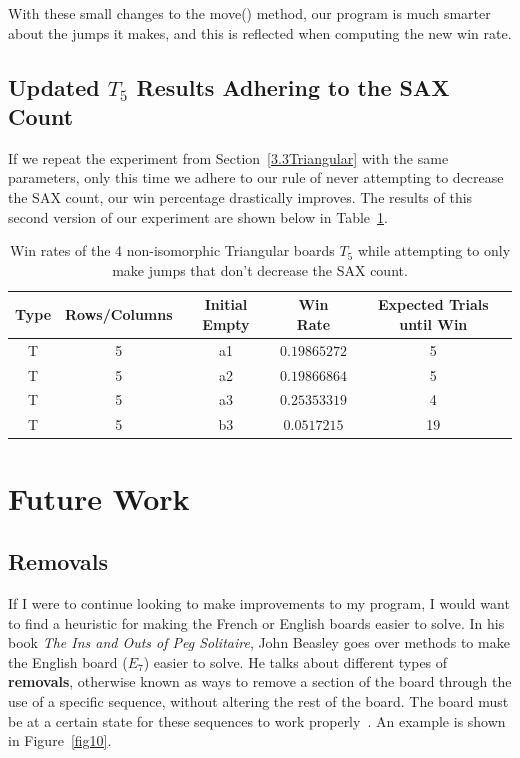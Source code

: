 \documentclass{article}
\begin{document}
With these small changes to the move() method, our program is much smarter about the jumps it makes, and this is reflected when computing the new win rate.

\subsection{Updated $T_5$ Results Adhering to the SAX Count}
\label{4.2UpatedResults}
If we repeat the experiment from Section~\ref{3.3Triangular} with the same parameters, only this time we adhere to our rule of never attempting to decrease the SAX count, our win percentage drastically improves. The results of this second version of our experiment are shown below in Table~\ref{tab4}.

\begin{table}[htb]
\begin{center} 
\begin{tabularx}{.88\textwidth}{ c  c  c  c  c }
\hline
\textbf{Type} & \textbf{Rows/Columns} &\textbf{Initial Empty} & \textbf{Win Rate} & \textbf{Expected Trials until Win}\\
\hline
T & 5 & a1 & $0.19865272$ & 5\\

T & 5 & a2 & $0.19866864$ & 5\\

T & 5 & a3 & $0.25353319$ & 4\\

T & 5 & b3 & $0.0517215$ & 19\\

\end{tabularx}
\caption{Win rates of the 4 non-isomorphic Triangular boards $T_5$ while attempting to only make jumps that don't decrease the SAX count.}
\label{tab4}
\end{center} 
\end{table}

\section{Future Work}
\label{5FutureWork}
\subsection{Removals}
If I were to continue looking to make improvements to my program, I would want to find a heuristic for making the French or English boards easier to solve. In his book \textit{The Ins and Outs of Peg Solitaire}, John Beasley goes over methods to make the English board ($E_7$) easier to solve. He talks about different types of \textbf{removals}, otherwise known as ways to remove a section of the board through the use of a specific sequence, without altering the rest of the board. The board must be at a certain state for these sequences to work properly~\cite{Beasley}. An example is shown in Figure~\ref{fig10}.
\end{document}
